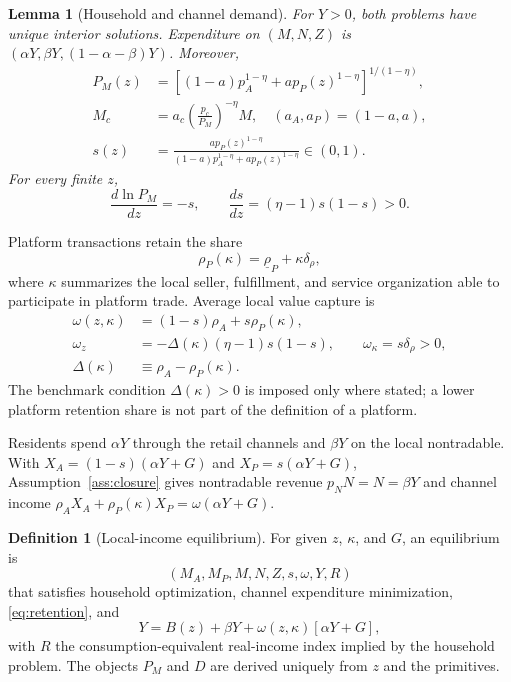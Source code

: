 \documentclass[11pt]{article}
\theoremstyle{plain}
\newtheorem{lemma}{Lemma}
\theoremstyle{definition}
\newtheorem{definition}{Definition}
\begin{document}
\begin{lemma}[Household and channel demand]
\label{lem:demand}
For \(Y>0\), both problems have unique interior solutions. Expenditure on
\((M,N,Z)\) is \((\alpha Y,\beta Y,(1-\alpha-\beta)Y)\). Moreover,
\begin{align}
 P_M(z)&=\left[(1-a)p_A^{1-\eta}
 +ap_P(z)^{1-\eta}\right]^{1/(1-\eta)}, \label{eq:price-index}\\
 M_c&=a_c\left(\frac{p_c}{P_M}\right)^{-\eta}M,
 \quad (a_A,a_P)=(1-a,a), \label{eq:hicksian-demand}\\
 s(z)&=\frac{ap_P(z)^{1-\eta}}
 {(1-a)p_A^{1-\eta}+ap_P(z)^{1-\eta}}\in(0,1). \label{eq:platform-share}
\end{align}
For every finite \(z\),
\begin{equation}
 \frac{d\ln P_M}{dz}=-s,\qquad
 \frac{ds}{dz}=(\eta-1)s(1-s)>0.
 \label{eq:access-derivatives}
\end{equation}
\end{lemma}

Platform transactions retain the share
\begin{equation}
 \rho_P(\kappa)=\underline\rho_P+\kappa\delta_\rho,
 \label{eq:platform-retention}
\end{equation}
where \(\kappa\) summarizes the local seller, fulfillment, and service
organization able to participate in platform trade. Average local value
capture is
\begin{align}
 \omega(z,\kappa)&=(1-s)\rho_A+s\rho_P(\kappa),
 \label{eq:retention}\\
 \omega_z&=-\Delta(\kappa)(\eta-1)s(1-s),\qquad
 \omega_\kappa=s\delta_\rho>0,
 \label{eq:retention-derivatives}\\
 \Delta(\kappa)&\equiv\rho_A-\rho_P(\kappa).
\end{align}
The benchmark condition \(\Delta(\kappa)>0\) is imposed only where stated; a
lower platform retention share is not part of the definition of a platform.

Residents spend \(\alpha Y\) through the retail channels and \(\beta Y\) on the
local nontradable. With \(X_A=(1-s)(\alpha Y+G)\) and
\(X_P=s(\alpha Y+G)\), Assumption~\ref{ass:closure} gives nontradable revenue
\(p_NN=N=\beta Y\) and channel income
\(\rho_AX_A+\rho_P(\kappa)X_P=\omega(\alpha Y+G)\).

\begin{definition}[Local-income equilibrium]
\label{def:equilibrium}
For given \(z\), \(\kappa\), and \(G\), an equilibrium is
\[
(M_A,M_P,M,N,Z,s,\omega,Y,R)
\]
that satisfies household optimization, channel expenditure minimization,
\eqref{eq:retention}, and
\begin{equation}
 Y=B(z)+\beta Y+\omega(z,\kappa)[\alpha Y+G],
 \label{eq:income-fixed-point}
\end{equation}
 with \(R\) the consumption-equivalent real-income index implied by the
 household problem. The objects \(P_M\) and \(D\) are derived uniquely from
 \(z\) and the primitives.
\end{definition}
\end{document}
